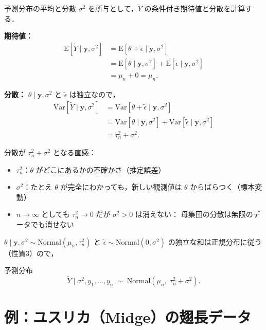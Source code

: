 \documentclass[lualatex,ja=standard,a4paper,12pt]{bxjsarticle}
\begin{document}
\begin{derivbox}{予測分布の平均と分散}
$\sigma^2$ を所与として，$\tilde{Y}$ の条件付き期待値と分散を計算する．

\medskip
\noindent\textbf{期待値：}
\begin{align*}
  \mathrm{E}[\tilde{Y} \mid \mathbf{y}, \sigma^2]
  &= \mathrm{E}[\theta + \tilde{\epsilon} \mid \mathbf{y}, \sigma^2] \\
  &= \mathrm{E}[\theta \mid \mathbf{y}, \sigma^2] + \mathrm{E}[\tilde{\epsilon} \mid \mathbf{y}, \sigma^2] \\
  &= \mu_n + 0 = \mu_n.
\end{align*}

\noindent\textbf{分散：}
$\theta \mid \mathbf{y}, \sigma^2$ と $\tilde{\epsilon}$ は独立なので，
\begin{align*}
  \mathrm{Var}[\tilde{Y} \mid \mathbf{y}, \sigma^2]
  &= \mathrm{Var}[\theta + \tilde{\epsilon} \mid \mathbf{y}, \sigma^2] \\
  &= \mathrm{Var}[\theta \mid \mathbf{y}, \sigma^2] + \mathrm{Var}[\tilde{\epsilon} \mid \mathbf{y}, \sigma^2] \\
  &= \tau_n^2 + \sigma^2.
\end{align*}

分散が $\tau_n^2 + \sigma^2$ となる直感：
\begin{itemize}
  \item $\tau_n^2$：$\theta$ がどこにあるかの不確かさ（推定誤差）
  \item $\sigma^2$：たとえ $\theta$ が完全にわかっても，新しい観測値は $\theta$ からばらつく（標本変動）
  \item $n \to \infty$ としても $\tau_n^2 \to 0$ だが $\sigma^2 > 0$ は消えない：
        母集団の分散は無限のデータでも消せない
\end{itemize}
\end{derivbox}

$\theta \mid \mathbf{y}, \sigma^2 \sim \mathrm{Normal}(\mu_n, \tau_n^2)$ と $\tilde{\epsilon} \sim \mathrm{Normal}(0, \sigma^2)$ の独立な和は正規分布に従う（性質3）ので，

\begin{thmbox}{予測分布}
\[
  \tilde{Y} \mid \sigma^2, y_1, \ldots, y_n
  \;\sim\; \mathrm{Normal}(\mu_n,\; \tau_n^2 + \sigma^2).
\]
\end{thmbox}


\section{例：ユスリカ（Midge）の翅長データ}
\end{document}
